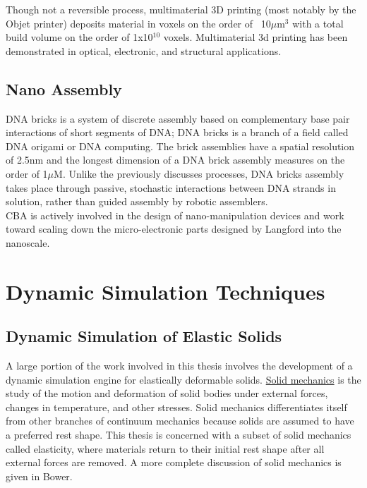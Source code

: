 {Though not a reversible process, multimaterial 3D printing (most notably by the Objet printer) deposits material in voxels on the order of ~10$\mu$m$^{3}$ with a total build volume on the order of 1x10$^{10}$ voxels\cite{Objet1000}.  Multimaterial 3d printing has been demonstrated in optical\cite{Willis2012}, electronic\cite{Ahn2009}, and structural applications\cite{Skouras2013}\cite{Schumacher}\cite{Bacher2014}.

\subsection{Nano Assembly}

DNA bricks is a system of discrete assembly based on complementary base pair interactions of short segments of DNA\cite{Ke2012}; DNA bricks is a branch of a field called DNA origami\cite{Rothemund2006} or DNA computing\cite{Seeman1982}\cite{Adleman1994}.  The brick assemblies have a spatial resolution of 2.5nm and the longest dimension of a DNA brick assembly measures on the order of 1$\mu$M\cite{Ke2014}.  Unlike the previously discusses processes, DNA bricks assembly takes place through passive, stochastic interactions between DNA strands in solution, rather than guided assembly by robotic assemblers.
\\

CBA is actively involved in the design of nano-manipulation devices and work toward scaling down the micro-electronic parts designed by Langford\cite{Langford2014} into the nanoscale.

\section{Dynamic Simulation Techniques}

\subsection{Dynamic Simulation of Elastic Solids}

A large portion of the work involved in this thesis involves the development of a dynamic simulation engine for elastically deformable solids.  \href{https://en.wikipedia.org/wiki/Solid_mechanics}{Solid mechanics} is the study of the motion and deformation of solid bodies under external forces, changes in temperature, and other stresses.  Solid mechanics differentiates itself from other branches of continuum mechanics because solids are assumed to have a preferred rest shape.  This thesis is concerned with a subset of solid mechanics called elasticity, where materials return to their initial rest shape after all external forces are removed.  A more complete discussion of solid mechanics is given in Bower\cite{Bower2009}.\\  

}
